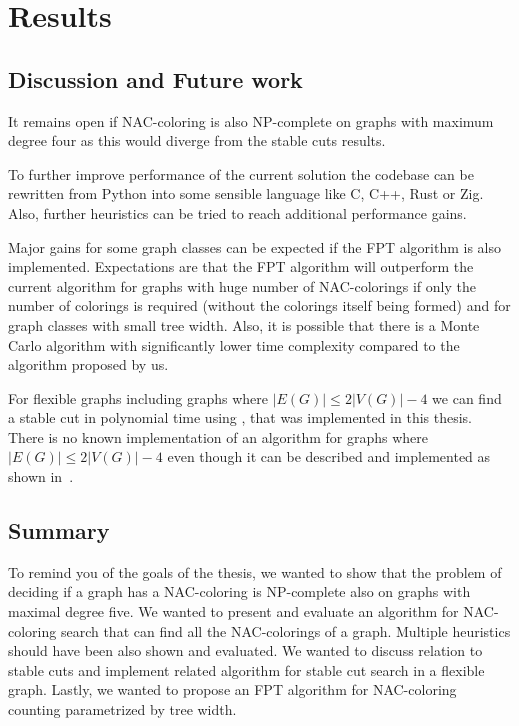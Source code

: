 
\chapter{Results}

\section{Discussion and Future work}

It remains open if NAC-coloring is also NP-complete on graphs with
maximum degree four as this would diverge from the stable cuts results.

To further improve performance of the current solution the codebase
can be rewritten from Python into some sensible language like C, C++, Rust or Zig.
Also, further heuristics can be tried to reach additional performance  gains.

Major gains for some graph classes
can be expected if the FPT algorithm is also implemented.
Expectations are that the FPT algorithm will outperform the current algorithm
for graphs with huge number of NAC-colorings if only the number of colorings
is required (without the colorings itself being formed) and
for graph classes with small tree width.
Also, it is possible that there is a Monte Carlo algorithm with significantly
lower time complexity compared to the algorithm proposed by us.

For flexible graphs including graphs where \( |E(G)| \le 2|V(G)| - 4 \)
we can find a stable cut in polynomial time using ,
that was implemented in this thesis.
There is no known implementation of an algorithm
for graphs where \( |E(G)| \le 2|V(G)| - 4 \)
even though it can be described and implemented
as shown in~\cite{stable_cuts_2v_3,stable_cuts_2v_3_revisit}.

\section{Summary}

To remind you of the goals of the thesis,
we wanted to show that the problem of deciding if a graph has a NAC-coloring
is NP-complete also on graphs with maximal degree five.
We wanted to present and evaluate an algorithm for NAC-coloring search
that can find all the NAC-colorings of a graph.
Multiple heuristics should have been also shown and evaluated.
We wanted to discuss relation to stable cuts and implement related algorithm
for stable cut search in a flexible graph.
Lastly, we wanted to propose an FPT algorithm for NAC-coloring counting
parametrized by tree width.

